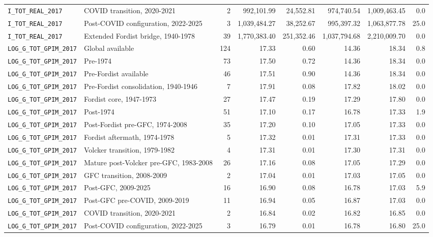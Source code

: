 \begin{landscape}
\begin{longtable}{p{4.4cm}p{3.8cm}rrrrrr}
\\
\nolinkurl{I_TOT_REAL_2017} & COVID transition, 2020-2021 & 2 & 992,101.99 & 24,552.81 & 974,740.54 & 1,009,463.45 & 0.0
\\
\nolinkurl{I_TOT_REAL_2017} & Post-COVID configuration, 2022-2025 & 3 & 1,039,484.27 & 38,252.67 & 995,397.32 & 1,063,877.78 & 25.0
\\
\nolinkurl{I_TOT_REAL_2017} & Extended Fordist bridge, 1940-1978 & 39 & 1,770,383.40 & 251,352.46 & 1,037,794.68 & 2,210,009.70 & 0.0
\\
\nolinkurl{LOG_G_TOT_GPIM_2017} & Global available & 124 & 17.33 & 0.60 & 14.36 & 18.34 & 0.8
\\
\nolinkurl{LOG_G_TOT_GPIM_2017} & Pre-1974 & 73 & 17.50 & 0.72 & 14.36 & 18.34 & 0.0
\\
\nolinkurl{LOG_G_TOT_GPIM_2017} & Pre-Fordist available & 46 & 17.51 & 0.90 & 14.36 & 18.34 & 0.0
\\
\nolinkurl{LOG_G_TOT_GPIM_2017} & Pre-Fordist consolidation, 1940-1946 & 7 & 17.91 & 0.08 & 17.82 & 18.02 & 0.0
\\
\nolinkurl{LOG_G_TOT_GPIM_2017} & Fordist core, 1947-1973 & 27 & 17.47 & 0.19 & 17.29 & 17.80 & 0.0
\\
\nolinkurl{LOG_G_TOT_GPIM_2017} & Post-1974 & 51 & 17.10 & 0.17 & 16.78 & 17.33 & 1.9
\\
\nolinkurl{LOG_G_TOT_GPIM_2017} & Post-Fordist pre-GFC, 1974-2008 & 35 & 17.20 & 0.10 & 17.05 & 17.33 & 0.0
\\
\nolinkurl{LOG_G_TOT_GPIM_2017} & Fordist aftermath, 1974-1978 & 5 & 17.32 & 0.01 & 17.31 & 17.33 & 0.0
\\
\nolinkurl{LOG_G_TOT_GPIM_2017} & Volcker transition, 1979-1982 & 4 & 17.31 & 0.01 & 17.30 & 17.31 & 0.0
\\
\nolinkurl{LOG_G_TOT_GPIM_2017} & Mature post-Volcker pre-GFC, 1983-2008 & 26 & 17.16 & 0.08 & 17.05 & 17.29 & 0.0
\\
\nolinkurl{LOG_G_TOT_GPIM_2017} & GFC transition, 2008-2009 & 2 & 17.04 & 0.01 & 17.03 & 17.05 & 0.0
\\
\nolinkurl{LOG_G_TOT_GPIM_2017} & Post-GFC, 2009-2025 & 16 & 16.90 & 0.08 & 16.78 & 17.03 & 5.9
\\
\nolinkurl{LOG_G_TOT_GPIM_2017} & Post-GFC pre-COVID, 2009-2019 & 11 & 16.94 & 0.05 & 16.87 & 17.03 & 0.0
\\
\nolinkurl{LOG_G_TOT_GPIM_2017} & COVID transition, 2020-2021 & 2 & 16.84 & 0.02 & 16.82 & 16.85 & 0.0
\\
\nolinkurl{LOG_G_TOT_GPIM_2017} & Post-COVID configuration, 2022-2025 & 3 & 16.79 & 0.01 & 16.78 & 16.80 & 25.0

\end{longtable}
\end{landscape}
